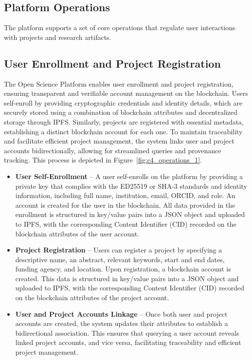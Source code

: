 \documentclass{article}
\begin{document}
\subsection{Platform Operations}
The platform supports a set of core operations that regulate user interactions with projects and research artifacts.

\subsection{User Enrollment and Project Registration}

\sloppy
The Open Science Platform enables user enrollment and project registration, ensuring transparent and verifiable account management on the blockchain. Users self-enroll by providing cryptographic credentials and identity details, which are securely stored using a combination of blockchain attributes and decentralized storage through IPFS. Similarly, projects are registered with essential metadata, establishing a distinct blockchain account for each one. To maintain traceability and facilitate efficient project management, the system links user and project accounts bidirectionally, allowing for streamlined queries and provenance tracking. This process is depicted in Figure~\ref{fig:c4_operations_1}.
\fussy

\begin{itemize}
      \item \textbf{User Self-Enrollment} – A user self-enrolls on the platform by providing a private key that complies with the ED25519 or SHA-3 standards and identity information, including full name, institution, email, ORCID, and role. An account is created for the user in the blockchain. All data provided in the enrollment is structured in key/value pairs into a JSON object and uploaded to IPFS, with the corresponding Content Identifier (CID) recorded on the blockchain attributes of the user account.

      \item \textbf{Project Registration} – Users can register a project by specifying a descriptive name, an abstract, relevant keywords, start and end dates, funding agency, and location. Upon registration, a blockchain account is created. This data is structured in key/value pairs into a JSON object and uploaded to IPFS, with the corresponding Content Identifier (CID) recorded on the blockchain attributes of the project account.


      \item \textbf{User and Project Accounts Linkage} – Once both user and project accounts are created, the system updates their attributes to establish a bidirectional association. This ensures that querying a user account reveals linked project accounts, and vice versa, facilitating traceability and efficient project management.
\end{itemize}
\end{document}
